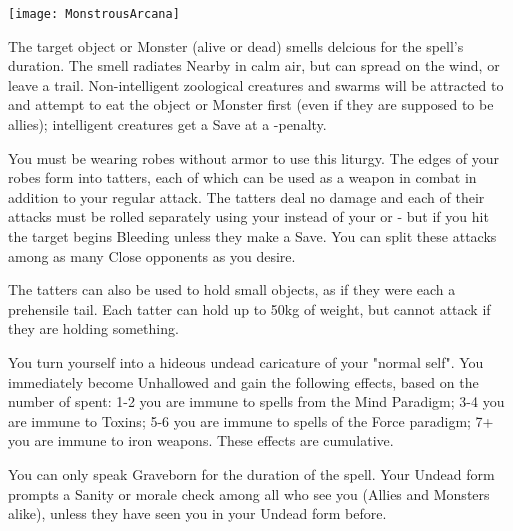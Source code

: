 {  \begin{center}
  \texttt{[image: MonstrousArcana]}
  \end{center}


\MYSTERY [
  Name = Tasty,
  Link = arcana-mystery-tasty,
  Paradigm = Biomancy,
  Save = N,
  Duration = Combat or \SUM Minutes,
  Target = Close Target(s)
]

The target object or Monster (alive or dead) smells delcious for the spell's duration.  The smell radiates Nearby in calm air, but can spread on the wind, or leave a trail.  Non-intelligent zoological creatures and swarms will be attracted to and attempt to eat the object or Monster first (even if they are supposed to be allies); intelligent creatures get a Save at a -\DICE penalty. 

\MYSTERY [
  Name = Tattered Robe,
  Link = arcana-mystery-tattered-robe,
  Paradigm = Entropy,
  Save = Y (neg.),
  Duration = Combat or \SUM Minutes,
  Target = Self
]

You must be wearing robes without armor to use this liturgy.  The edges of your robes form into \DICE tatters, each of which can be used as a weapon in combat in addition to your regular attack. The tatters deal no damage and each of their attacks must be rolled separately using your \FOC instead of your \VIG or \DEX - but if you hit the target begins Bleeding unless they make a Save.  You can split these attacks among as many Close opponents as you desire.

The tatters can also be used to hold small objects, as if they were each a prehensile tail.  Each tatter can hold up to 50kg of weight, but cannot attack if they are holding something.

\MYSTERY [
  Name = Undead Visage,
  Link = arcana-mystery-undead-visage,
  Paradigm = Death,
  Save = n/a,
  Duration = Combat or \SUM Minutes,
  Target = Self
]

You turn yourself into a hideous undead caricature of your "normal self".  You immediately become Unhallowed and gain the following effects, based on the number of \DICE spent:  1-2 you are immune to spells from the Mind Paradigm; 3-4 you are immune to Toxins; 5-6 you are immune to spells of the Force paradigm; 7+  you are immune to iron weapons.  These effects are cumulative.

You can only speak Graveborn for the duration of the spell.  Your Undead form prompts a Sanity or morale check among all who see you (Allies and Monsters alike), unless they have seen you in your Undead form before. 


}
